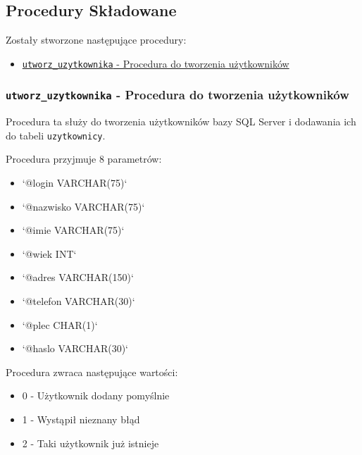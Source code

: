 \subsection{Procedury Składowane}

Zostały stworzone następujące procedury:
\begin{itemize}
	\item \href{run:Sources/SQL/6. Procedury Składowamne/032_Utworzenie_procedury_skladowanej_do_tworzenia_uzytkownikow.sql}{\texttt{utworz\_uzytkownika} - Procedura do tworzenia użytkowników}
\end{itemize}

\subsubsection{\texttt{utworz\_uzytkownika} - Procedura do tworzenia użytkowników}

Procedura ta służy do tworzenia użytkowników bazy SQL Server i dodawania ich do tabeli \texttt{uzytkownicy}.

Procedura przyjmuje 8 parametrów:
\begin{itemize}
	\item `@login VARCHAR(75)`
	\item `@nazwisko VARCHAR(75)`
	\item `@imie VARCHAR(75)`
	\item `@wiek INT`
	\item `@adres VARCHAR(150)`
	\item `@telefon VARCHAR(30)`
	\item `@plec CHAR(1)`
	\item `@haslo VARCHAR(30)`
\end{itemize}

Procedura zwraca następujące wartości:
\begin{itemize}
	\item 0 - Użytkownik dodany pomyślnie
	\item 1 - Wystąpił nieznany błąd
	\item 2 - Taki użytkownik już istnieje
\end{itemize}

